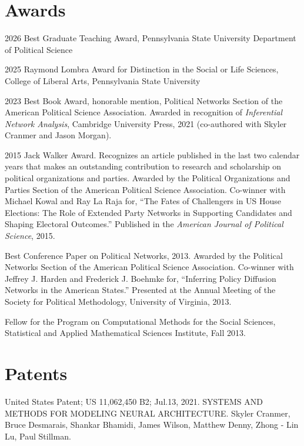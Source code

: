\documentclass[overlapped,line]{res}
\begin{document}
\begin{resume}
\section{\bf Awards}
\begin{etaremune}
\item 2026 Best Graduate Teaching Award, Pennsylvania State University Department of Political Science
\item 2025 Raymond Lombra Award for Distinction in the Social or Life Sciences, College of Liberal Arts, Pennsylvania State University
\item 2023 Best Book Award, honorable mention, Political Networks Section of the American Political Science Association. Awarded in recognition of {\em Inferential Network Analysis}, Cambridge University Press, 2021 (co-authored with Skyler Cranmer and Jason Morgan). 
\item 2015 Jack Walker Award. Recognizes an article published in the last two calendar years that makes an outstanding contribution to research and scholarship on political organizations and parties. Awarded by the Political Organizations and Parties Section of the American Political Science Association. Co-winner with Michael Kowal and Ray La Raja for, ``The Fates of Challengers in US House Elections: The Role of Extended Party Networks in Supporting Candidates and Shaping Electoral Outcomes.''  Published in the {\em American Journal of Political Science}, 2015.
\item Best Conference Paper on Political Networks, 2013. Awarded by the Political Networks Section of the American Political Science Association. Co-winner with Jeffrey J. Harden and Frederick J. Boehmke for, ``Inferring Policy Diffusion Networks in the American States.''  Presented at the Annual Meeting of the Society for Political Methodology, University of Virginia, 2013.
\item Fellow for the Program on Computational Methods for the Social Sciences, Statistical and Applied Mathematical Sciences Institute, Fall 2013.
\end{etaremune}

\section{\bf Patents}
\begin{etaremune}
\item United States Patent; US 11,062,450 B2; Jul.13, 2021. SYSTEMS AND METHODS FOR MODELING
NEURAL ARCHITECTURE.  Skyler Cranmer, Bruce Desmarais,  Shankar Bhamidi, James Wilson,  Matthew Denny,  Zhong - Lin Lu, Paul Stillman. 
\end{etaremune}


\end{resume}
\end{document}

